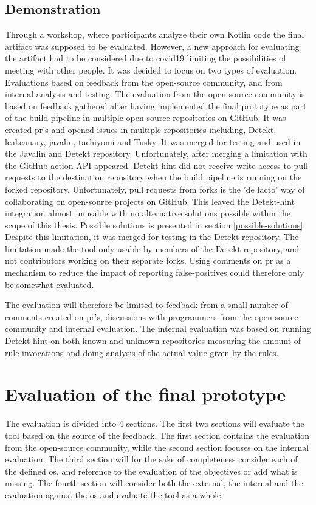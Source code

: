 \documentclass[pdftex,10pt,b5paper,twoside]{report}
\begin{document}
\subsection*{Demonstration}

Through a workshop, where participants analyze their own Kotlin code the final artifact was supposed to be evaluated. However, a new approach for evaluating the artifact had to be considered due to \gls{covid19} limiting the possibilities of meeting with other people. It was decided to focus on two types of evaluation. Evaluations based on feedback from the open-source community, and from internal analysis and testing. The evaluation from the open-source community is based on feedback gathered after having implemented the final prototype as part of the build pipeline in multiple open-source repositories on GitHub. It was created \gls{pr}'s and opened issues in multiple repositories including, Detekt\cite{detekt}, leakcanary\cite{leakcanary}, javalin\cite{javalin}, tachiyomi\cite{tachiyomi} and Tusky\cite{tusky}. It was merged for testing and used in the Javalin and Detekt repository. Unfortunately, after merging a limitation with the GitHub action API appeared. Detekt-hint did not receive write access to pull-requests to the destination repository when the build pipeline is running on the forked repository. Unfortunately, pull requests from forks is the 'de facto' way of collaborating on open-source projects on GitHub. This leaved the Detekt-hint integration almost unusable with no alternative solutions possible within the scope of this thesis. Possible solutions is presented in section \ref{possible-solutions}. Despite this limitation, it was merged for testing in the Detekt repository. The limitation made the tool only usable by members of the Detekt repository, and not contributors working on their separate forks. Using comments on \gls{pr} as a mechanism to reduce the impact of reporting false-positives could therefore only be somewhat evaluated.

The evaluation will therefore be limited to feedback from a small number of comments created on \gls{pr}'s, discussions with programmers from the open-source community and internal evaluation. The internal evaluation was based on running Detekt-hint on both known and unknown repositories measuring the amount of rule invocations and doing analysis of the actual value given by the rules. 

\section{Evaluation of the final prototype}
\label{evaluation-final-prototype}
The evaluation is divided into 4 sections. The first two sections will evaluate the tool based on the source of the feedback. The first section contains the evaluation from the open-source community, while the second section focuses on the internal evaluation. The third section will for the sake of completeness consider each of the defined \gls{os}, and reference to the evaluation of the objectives or add what is missing.  The fourth section will consider both the external, the internal and the evaluation against the \gls{os} and evaluate the tool as a whole. 
\end{document}
